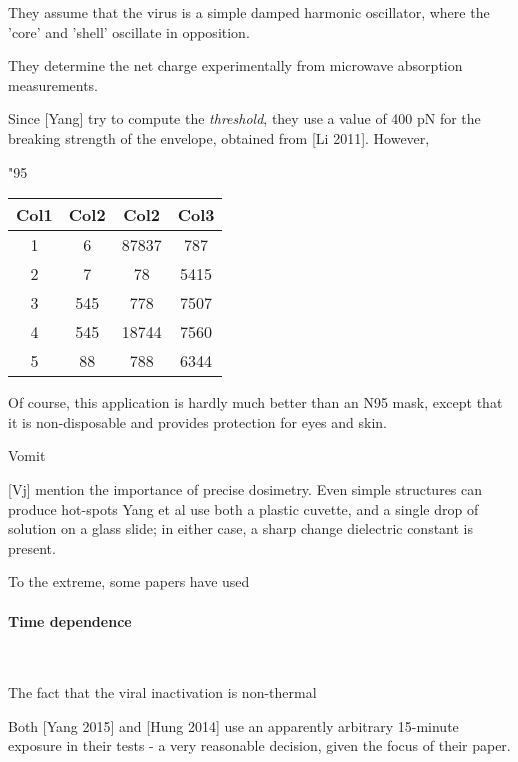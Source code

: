 \documentclass[fleqn,10pt]{article}
\begin{document}
They assume that the virus is a simple damped harmonic oscillator, where the 'core' and 'shell' oscillate in opposition. 

They determine the net charge experimentally from microwave absorption measurements.

Since [Yang] try to compute the {\it threshold}, they use a value of 400 pN for the breaking strength of the envelope, obtained from [Li 2011]. However,  

"95%

\begin{center}
 \begin{tabular}{||c c c c||} 
 \hline
 Col1 & Col2 & Col2 & Col3 \\ [0.5ex] 
 \hline\hline
 1 & 6 & 87837 & 787 \\ 
 \hline
 2 & 7 & 78 & 5415 \\
 \hline
 3 & 545 & 778 & 7507 \\
 \hline
 4 & 545 & 18744 & 7560 \\
 \hline
 5 & 88 & 788 & 6344 \\ [1ex] 
 \hline
\end{tabular}
\end{center}





Of course, this application is hardly much better than an N95 mask, except that it is non-disposable and provides protection for eyes and skin.

Vomit


[Vj] mention the importance of precise dosimetry. Even simple structures can produce hot-spots 
Yang et al use both a plastic cuvette, and a single drop of solution on a glass slide; in either case, a sharp change dielectric constant is present.

To the extreme, some papers have used














\clearpage
\paragraph{\textbf{Time dependence}}\

The fact that the viral inactivation is non-thermal

Both [Yang 2015] and [Hung 2014] use an apparently arbitrary 15-minute exposure in their tests - a very reasonable decision, given the focus of their paper. 
\end{document}
